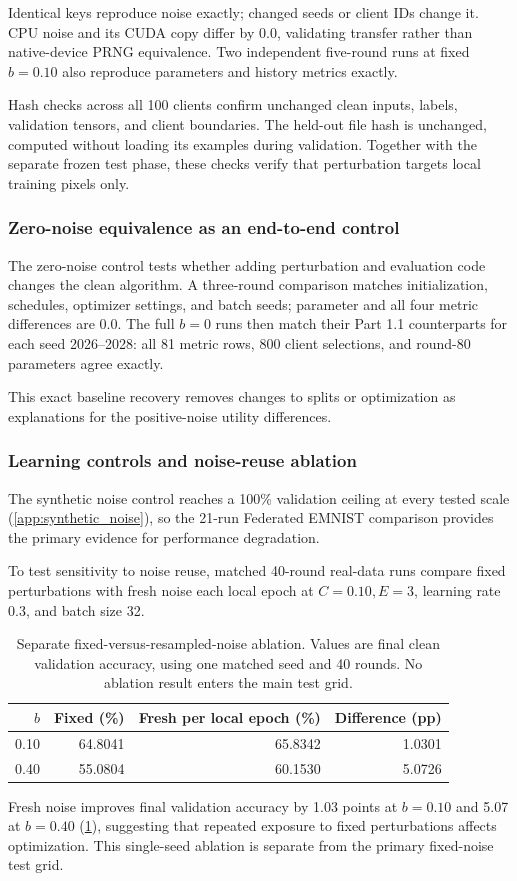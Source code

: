 Identical keys reproduce noise exactly; changed seeds or client IDs change it. CPU noise and its CUDA copy differ by 0.0, validating transfer rather than native-device PRNG equivalence. Two independent five-round runs at fixed $b=0.10$ also reproduce parameters and history metrics exactly.

Hash checks across all 100 clients confirm unchanged clean inputs, labels, validation tensors, and client boundaries. The held-out file hash is unchanged, computed without loading its examples during validation. Together with the separate frozen test phase, these checks verify that perturbation targets local training pixels only.

\subsubsection{Zero-noise equivalence as an end-to-end control}
The zero-noise control tests whether adding perturbation and evaluation code changes the clean algorithm. A three-round comparison matches initialization, schedules, optimizer settings, and batch seeds; parameter and all four metric differences are 0.0. The full $b=0$ runs then match their Part 1.1 counterparts for each seed 2026--2028: all 81 metric rows, 800 client selections, and round-80 parameters agree exactly.

This exact baseline recovery removes changes to splits or optimization as explanations for the positive-noise utility differences.

\subsubsection{Learning controls and noise-reuse ablation}
The synthetic noise control reaches a 100\% validation ceiling at every tested scale (\cref{app:synthetic_noise}), so the 21-run Federated EMNIST comparison provides the primary evidence for performance degradation.

To test sensitivity to noise reuse, matched 40-round real-data runs compare fixed perturbations with fresh noise each local epoch at $C=0.10,E=3$, learning rate 0.3, and batch size 32.
\begin{table}[htbp]
\centering
\caption{Separate fixed-versus-resampled-noise ablation. Values are final clean validation accuracy, using one matched seed and 40 rounds. No ablation result enters the main test grid.}\label{tab:ablation}
\begin{tabular}{rrrr}
\toprule
$b$ & Fixed (\%) & Fresh per local epoch (\%) & Difference (pp)\\
\midrule
0.10 & 64.8041 & 65.8342 & 1.0301\\
0.40 & 55.0804 & 60.1530 & 5.0726\\
\bottomrule
\end{tabular}
\end{table}
Fresh noise improves final validation accuracy by 1.03 points at $b=0.10$ and 5.07 at $b=0.40$ (\cref{tab:ablation}), suggesting that repeated exposure to fixed perturbations affects optimization. This single-seed ablation is separate from the primary fixed-noise test grid.

